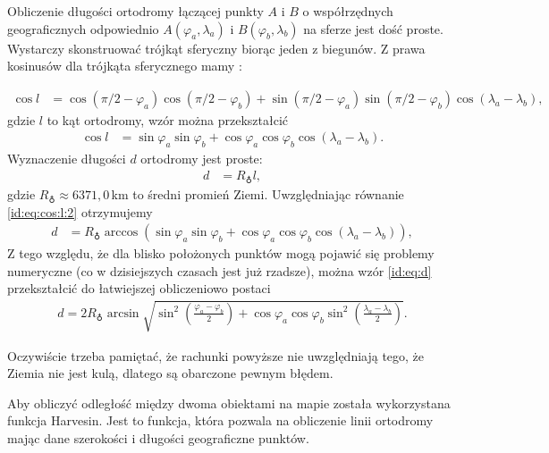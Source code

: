 \documentclass[a4paper]{book}
\begin{document}
			{\color{blue}
			Obliczenie długości ortodromy łączącej punkty $A$ i $B$ o współrzędnych geograficznych odpowiednio $A(\varphi_a, \lambda_a)$ i $B(\varphi_b, \lambda_b)$ na sferze jest dość proste. Wystarczy skonstruować trójkąt sferyczny biorąc jeden z biegunów. Z prawa kosinusów dla trójkąta sferycznego mamy \cite{id:Mietelski1989Atronomia}:

			\begin{align}
			\cos l & = \cos (\pi/2 - \varphi_a) \cos (\pi/2 - \varphi_b) + \sin (\pi/2 - \varphi_a) \sin (\pi/2 - \varphi_b) \cos (\lambda_a - \lambda_b),
			\end{align}
			gdzie $l$ to kąt ortodromy, wzór można przekształcić
			\begin{align}
			\cos l & = \sin\varphi_a \sin \varphi_b + \cos\varphi_a \cos\varphi_b \cos (\lambda_a - \lambda_b).\label{id:eq:cos:l:2}						
			\end{align}
			Wyznaczenie długości $d$ ortodromy jest proste:
			\begin{align}
			d & =   R_{\earth} l,
			\end{align}
			gdzie $R_{\earth} \approx 6371{,}0\,$km to średni promień Ziemi.
			Uwzględniając równanie \eqref{id:eq:cos:l:2} otrzymujemy
			\begin{align}
		    d & =   R_{\earth} \arccos \left( \sin\varphi_a \sin \varphi_b + \cos\varphi_a \cos\varphi_b \cos (\lambda_a - \lambda_b) \right),\label{id:eq:d}
			\end{align}
			Z tego względu, że dla blisko położonych punktów mogą pojawić się problemy numeryczne (co w dzisiejszych czasach jest już rzadsze), można wzór \eqref{id:eq:d} przekształcić do łatwiejszej obliczeniowo postaci
			\begin{align}
            d = 2R_{\earth} \arcsin\sqrt{\sin^{2}\left(\frac{\varphi_a - \varphi_b}{2}\right) + \cos\varphi_a\cos\varphi_b\sin^{2}\left(\frac{\lambda_a - \lambda_b}{2}\right) }.
			\end{align}
						
			Oczywiście trzeba pamiętać, że rachunki powyższe nie uwzględniają tego, że Ziemia nie jest kulą, dlatego są obarczone pewnym błędem. 
			}
			
			Aby obliczyć odległość między dwoma obiektami na mapie została wykorzystana funkcja Harvesin. Jest to funkcja, która pozwala na obliczenie linii ortodromy mając dane szerokości i długości geograficzne punktów. 
						
\end{document}
